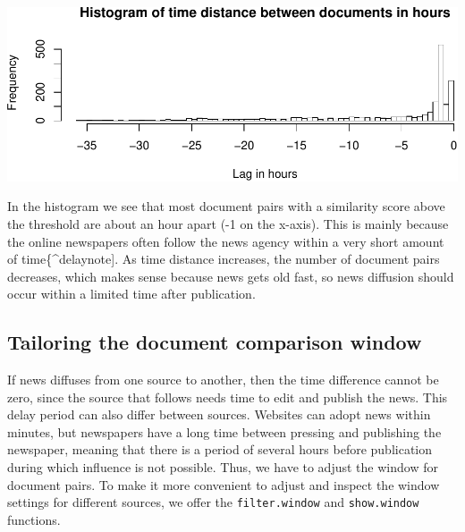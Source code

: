 \documentclass[]{article}
\newenvironment{Shaded}{\begin{snugshade}}{\end{snugshade}}
\newcommand{\KeywordTok}[1]{\textcolor[rgb]{0.13,0.29,0.53}{\textbf{{#1}}}}
\newcommand{\DataTypeTok}[1]{\textcolor[rgb]{0.13,0.29,0.53}{{#1}}}
\newcommand{\DecValTok}[1]{\textcolor[rgb]{0.00,0.00,0.81}{{#1}}}
\newcommand{\StringTok}[1]{\textcolor[rgb]{0.31,0.60,0.02}{{#1}}}
\newcommand{\NormalTok}[1]{{#1}}
\begin{document}
\begin{Shaded}
\end{Shaded}

\includegraphics{vignette_files/figure-latex/unnamed-chunk-11-1.pdf}

In the histogram we see that most document pairs with a similarity score
above the threshold are about an hour apart (-1 on the x-axis). This is
mainly because the online newspapers often follow the news agency within
a very short amount of time\{\^{}delaynote{]}. As time distance
increases, the number of document pairs decreases, which makes sense
because news gets old fast, so news diffusion should occur within a
limited time after publication.

\subsection{Tailoring the document comparison
window}\label{tailoring-the-document-comparison-window}

If news diffuses from one source to another, then the time difference
cannot be zero, since the source that follows needs time to edit and
publish the news. This delay period can also differ between sources.
Websites can adopt news within minutes, but newspapers have a long time
between pressing and publishing the newspaper, meaning that there is a
period of several hours before publication during which influence is not
possible. Thus, we have to adjust the window for document pairs. To make
it more convenient to adjust and inspect the window settings for
different sources, we offer the \texttt{filter.window} and
\texttt{show.window} functions.
\end{document}
